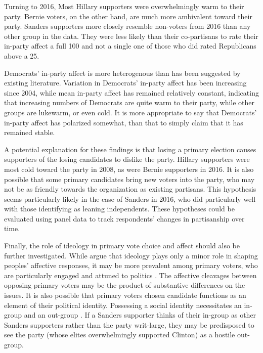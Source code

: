 \documentclass[12pt]{article}
\begin{document}
Turning to 2016, Most Hillary supporters were overwhelmingly warm to their party. Bernie voters, on the other hand, are much more ambivalent toward their party. Sanders supporters more closely resemble non-voters from 2016 than any other group in the data. They were less likely than their co-partisans to rate their in-party affect a full 100 and not a single one of those who did rated Republicans above a 25.

Democrats' in-party affect is more heterogenous than has been suggested by existing literature. Variation in Democrats' in-party affect has been increasing since 2004, while mean in-party affect has remained relatively constant, indicating that increasing numbers of Democrats are quite warm to their party, while other groups are lukewarm, or even cold. It is more appropriate to say that Democrats' in-party affect has polarized somewhat, than that to simply claim that it has remained stable.

%


 A potential explanation for these findings is that losing a primary election causes supporters of the losing candidates to dislike the party. Hillary supporters were most cold toward the party in 2008, as were Bernie supporters in 2016. It is also possible that some primary candidates bring new voters into the party, who may not be as friendly towards the organization as existing partisans. This hypothesis seems particularly likely in the case of Sanders in 2016, who did particularly well with those identifying as leaning independents. These hypotheses could be evaluated using panel data to track respondents' changes in partisanship over time.

Finally, the role of ideology in primary vote choice and affect should also be further investigated. While \cite{iyengar2012affect} argue that ideology plays only a minor role in shaping peoples' affective responses, it may be more prevalent among primary voters, who are particularly engaged and attuned to politics \citep{iyengar2012affect}. The affective cleavages between opposing primary voters may be the product of substantive differences on the issues. It is also possible that primary voters chosen candidate functions as an element of their political identity. Possessing a social identity necessitates an in-group and an out-group \citep{brewer2001many}. If a Sanders supporter thinks of their in-group as other Sanders supporters rather than the party writ-large, they may be predisposed to see the party (whose elites overwhelmingly supported Clinton) as a hostile out-group. 
\end{document}
